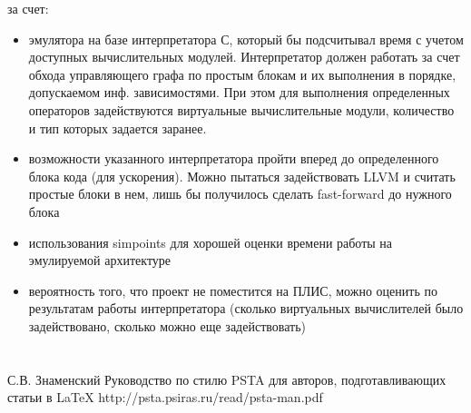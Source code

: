 \documentclass[utf8]{psta}%
\begin{document}
за счет:

\begin{itemize}
   \item  эмулятора на базе интерпретатора С, который бы подсчитывал время с учетом доступных вычислительных модулей. Интерпретатор должен работать за счет обхода управляющего графа по простым блокам и их выполнения в порядке, допускаемом инф. зависимостями. При этом для выполнения определенных операторов задействуются виртуальные вычислительные модули, количество и тип которых задается заранее.
   \item возможности указанного интерпретатора пройти вперед до определенного блока кода (для ускорения). Можно пытаться задействовать LLVM и считать простые блоки в нем, лишь бы получилось сделать fast-forward до нужного блока
   \item использования simpoints для хорошей оценки времени работы на эмулируемой архитектуре
   \item вероятность того, что проект не поместится на ПЛИС, можно оценить по результатам работы интерпретатора (сколько виртуальных вычислителей было задействовано, сколько можно еще задействовать)
\end{itemize}
   

\section{}
\subsection{}


% 
\begin{thebibliography}{30}
%
%
%
\by С.В. Знаменский
\preprint Руководство по стилю PSTA для авторов, подготавливающих статьи в \LaTeX
{} 
\URL http://psta.psiras.ru/read/psta-man.pdf

\end{thebibliography}
\end{document}

